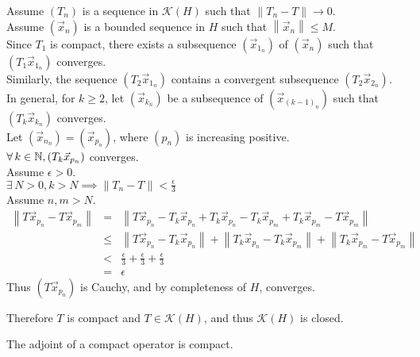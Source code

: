 \documentclass[letterpaper,12pt,fleqn]{article}
\newcommand{\vx}{\vec{x}}
\newcommand{\norm}[1]{\left\|#1\right\|}
\newcommand{\e}{\epsilon}
\newcommand{\mk}{\mathcal{K}}
\begin{document}
\begin{theproof}
  Assume $(T_n)$ is a sequence in $\mk(H)$ such that $\norm{T_n-T}\to0$. \\
  Assume $(\vx_n)$ is a bounded sequence in $H$ such that
  $\norm{\vx_n}\le M$. \\
  Since $T_1$ is compact, there exists a subsequence $(\vx_{1_n})$ of $(\vx_n)$
  such that $(T_1\vx_{1_n})$ converges. \\
  Similarly, the sequence $(T_2\vx_{1_n})$ contains a convergent subsequence
  $(T_2\vx_{2_n})$. \\
  In general, for $k\ge2$, let $(\vx_{k_n})$ be a subsequence of
  $(\vx_{(k-1)_n})$ such that $(T_k\vx_{k_n})$ converges. \\
  Let $(\vx_{n_n})=(\vx_{p_n})$, where $(p_n)$ is increasing positive. \\
  $\forall\,k\in\N,(T_k\vx_{p_n})$ converges. \\
  Assume $\e>0$. \\
  $\exists\,N>0,k>N\implies\norm{T_n-T}<\frac{\e}{3}$ \\
  Assume $n,m>N$.
  \begin{eqnarray*}
    \norm{T\vx_{p_n}-T\vx_{p_m}} &=&
    \norm{T\vx_{p_n}-T_k\vx_{p_n}+T_k\vx_{p_n}-T_k\vx_{p_m}+T_k\vx_{p_m}
      -T\vx_{p_m}} \\
    &\le& \norm{T\vx_{p_n}-T_k\vx_{p_n}}+\norm{T_k\vx_{p_n}-T_k\vx_{p_m}}+
    \norm{T_k\vx_{p_m}-T\vx_{p_m}} \\
    &<& \frac{\e}{3}+\frac{\e}{3}+\frac{\e}{3} \\
    &=& \e
  \end{eqnarray*}
  Thus $(T\vx_{p_n})$ is Cauchy, and by completeness of $H$, converges.

  Therefore $T$ is compact and $T\in\mk(H)$, and thus $\mk(H)$ is closed.
\end{theproof}

\begin{theorem}
  The adjoint of a compact operator is compact.
\end{theorem}
\end{document}
